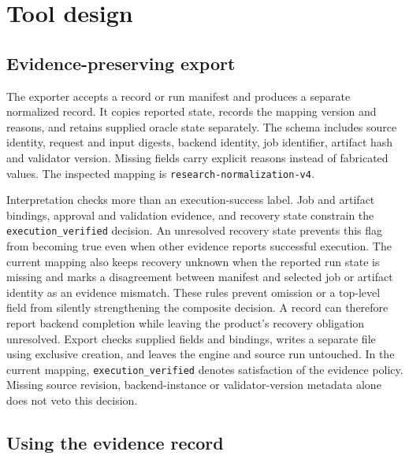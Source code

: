 \documentclass[conference,letterpaper,10pt]{IEEEtran}
\begin{document}
\section{Tool design}

\subsection{Evidence-preserving export}

The exporter accepts a record or run manifest and produces a separate normalized
record. It copies reported state, records the mapping version and reasons, and
retains supplied oracle state separately. The schema includes source identity,
request and input digests, backend identity, job identifier, artifact hash and
validator version. Missing fields carry explicit reasons instead of fabricated
values. The inspected mapping is \texttt{research-normalization-v4}.

Interpretation checks more than an execution-success label. Job and artifact
bindings, approval and validation evidence, and recovery state constrain the
\texttt{execution\_verified} decision. An unresolved recovery state prevents this flag
from becoming true even when other evidence reports successful execution.
The current mapping also keeps recovery unknown when the reported run state is
missing and marks a disagreement between manifest and selected job or artifact
identity as an evidence mismatch. These rules prevent omission or a top-level
field from silently strengthening the composite decision.
A record can therefore report backend completion while leaving the product's
recovery obligation unresolved. Export checks supplied fields and bindings,
writes a separate file using exclusive creation, and leaves the engine and
source run untouched. In the current mapping, \texttt{execution\_verified}
denotes satisfaction of the evidence policy. Missing source revision,
backend-instance or validator-version metadata alone does not veto this decision.

\subsection{Using the evidence record}
\end{document}
